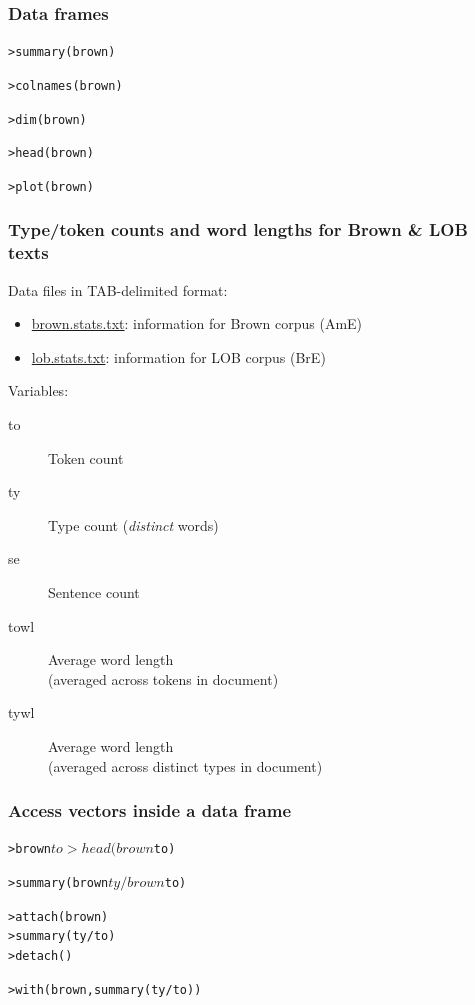 \documentclass[t]{beamer} %
\begin{document}
\begin{frame}[fragile]
  \frametitle{Data frames}

\begin{alltt}
> summary(brown)

> colnames(brown)

> dim(brown)       

> head(brown)

> plot(brown)
\end{alltt}

\end{frame}


\begin{frame}
  \frametitle{Type/token counts and word lengths for Brown \& LOB texts}

  Data files in TAB-delimited format:
  \begin{itemize}
  \item \url{brown.stats.txt}: information for Brown corpus (AmE)
  \item \url{lob.stats.txt}: information for LOB corpus (BrE)
  \end{itemize}

  \gap
  Variables:
  \begin{description}
  \item[to] Token count
  \item[ty] Type count (\emph{distinct} words)
  \item[se] Sentence count
  \item[towl] Average word length\\ (averaged across tokens in document)
  \item[tywl] Average word length\\ (averaged across distinct types in
    document)
  \end{description}
\end{frame}


\begin{frame}[fragile]
  \frametitle{Access vectors inside a data frame}

\ungap[1]
\begin{alltt}
> brown$to
> head(brown$to)


> summary(brown$ty / brown$to)

> attach(brown)   
> summary(ty/to)
> detach()        

> with(brown, summary(ty/to)) 
\end{alltt}

\end{frame}
\end{document}
